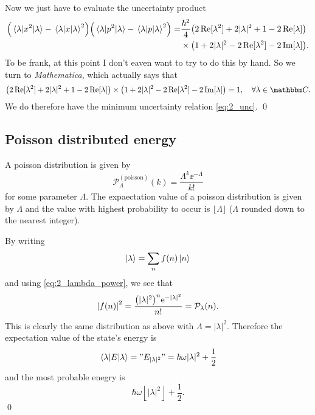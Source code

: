 \documentclass[11pt,letter, swedish, english
]{article}
\begin{document}
Now we just have to evaluate the uncertainty product
\begin{equation}
\begin{aligned}
\qty(\ev{x^2}{\lambda}-\ev{x}{\lambda}^2)
\qty(\ev{p^2}{\lambda}-\ev{p}{\lambda}^2)
=&\frac{\hbar^2}{4}
\qty(2\Re[\lambda^2] + 2|\lambda|^2 + 1 - 2\Re[\lambda])\\
&\times\qty(1+2|\lambda|^2 - 2\Re[\lambda^2]-2\Im[\lambda]).
\end{aligned}
\end{equation}
To be frank, at this point I don't eaven want to try to do this by
hand. So we turn to \emph{Mathematica}, which actually says that
\begin{equation}
\qty(2\Re[\lambda^2] + 2|\lambda|^2 + 1 - 2\Re[\lambda])
\times\qty(1+2|\lambda|^2 - 2\Re[\lambda^2]-2\Im[\lambda])
=1\qcomma\forall\lambda\in\C.
\end{equation}
We do therefore have the minimum uncertainty relation
\eqref{eq:2_unc}. 
\qed

\subsection{Poisson distributed energy}
A poisson distribution is given by
\begin{equation}
\mathcal{P}_\Lambda^{(\text{poisson})}(k)=\frac{\Lambda^k\ee^{-\Lambda}}{k!}
\end{equation}
for some parameter $\Lambda$. The expaectation value of a poisson
distribution is given by $\Lambda$ and the value with highest
probability to occur is $\lfloor\Lambda\rfloor$ ($\Lambda$ rounded
down to the nearest integer).

By writing
\begin{equation}
\ket{\lambda}=\sum_n f(n)\ket{n}
\end{equation}
and using \eqref{eq:2_lambda_power}, we see that
\begin{equation}
\abs{f(n)}^2=\frac{\qty(|\lambda|^2)^n\mathrm{e}^{-|\lambda|^2}}{n!}
=\mathcal{P}_\lambda(n).
\end{equation}
This is clearly the same distribution as above with
$\Lambda=|\lambda|^2$. Therefore the expectation value of the state's
energy is
\begin{equation}
\ev{E}{\lambda}="E_{|\lambda|^2}"=\hbar\omega|\lambda|^2+\frac{1}{2}
\end{equation}
and the most probable enegry is
\begin{equation}
\hbar\omega\left\lfloor|\lambda|^2\right\rfloor+\frac{1}{2}.
\end{equation}
\qed
\end{document}

